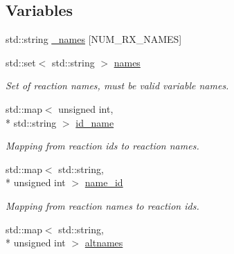\subsection*{Variables}
\begin{DoxyCompactItemize}
\item 
std\+::string \hyperlink{namespacepyne_1_1rxname_a880e1a059fe54b6fd425cc3319978555}{\+\_\+names} \mbox{[}N\+U\+M\+\_\+\+R\+X\+\_\+\+N\+A\+M\+E\+S\mbox{]}
\item 
\hypertarget{namespacepyne_1_1rxname_a28dfc07e16c270b89549889be5d3146d}{std\+::set$<$ std\+::string $>$ \hyperlink{namespacepyne_1_1rxname_a28dfc07e16c270b89549889be5d3146d}{names}}\label{namespacepyne_1_1rxname_a28dfc07e16c270b89549889be5d3146d}

\begin{DoxyCompactList}\small\item\em Set of reaction names, must be valid variable names. \end{DoxyCompactList}\item 
\hypertarget{namespacepyne_1_1rxname_a28e72f5e8a19c035368e0eb72b2947d5}{std\+::map$<$ unsigned int, \\*
std\+::string $>$ \hyperlink{namespacepyne_1_1rxname_a28e72f5e8a19c035368e0eb72b2947d5}{id\+\_\+name}}\label{namespacepyne_1_1rxname_a28e72f5e8a19c035368e0eb72b2947d5}

\begin{DoxyCompactList}\small\item\em Mapping from reaction ids to reaction names. \end{DoxyCompactList}\item 
\hypertarget{namespacepyne_1_1rxname_a615522d66adc558775f60c559b3127fe}{std\+::map$<$ std\+::string, \\*
unsigned int $>$ \hyperlink{namespacepyne_1_1rxname_a615522d66adc558775f60c559b3127fe}{name\+\_\+id}}\label{namespacepyne_1_1rxname_a615522d66adc558775f60c559b3127fe}

\begin{DoxyCompactList}\small\item\em Mapping from reaction names to reaction ids. \end{DoxyCompactList}\item 
\hypertarget{namespacepyne_1_1rxname_a7109ca2a2a6aea74d372262172e3a203}{std\+::map$<$ std\+::string, \\*
unsigned int $>$ \hyperlink{namespacepyne_1_1rxname_a7109ca2a2a6aea74d372262172e3a203}{altnames}}\label{namespacepyne_1_1rxname_a7109ca2a2a6aea74d372262172e3a203}


\end{DoxyCompactItemize}

